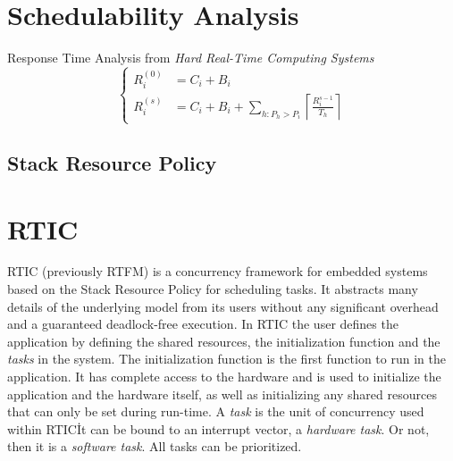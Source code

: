 \section{Schedulability Analysis}
Response Time Analysis from \textit{Hard Real-Time Computing Systems}\cite{hardrealtimecomputingsystems}
\begin{equation}
    \begin{cases}
        R_{i}^{(0)} &= C_i + B_i \\
        R_{i}^{(s)} &= C_i + B_i + \sum\limits_{h: P_h > P_i} \left\lceil \frac{R_{i}^{s-1}}{T_h} \right\rceil
    \end{cases}
\end{equation}
\subsection{Stack Resource Policy}


\section{RTIC}
RTIC (previously RTFM\cite{rtfm}) is a concurrency framework for embedded
systems based on the Stack Resource Policy\cite{srp} for scheduling tasks. It
abstracts many details of the underlying model from its users without any
significant overhead and a guaranteed deadlock-free execution. In RTIC the
user defines the application by defining the shared resources, the
initialization function and the \emph{tasks} in the system. The initialization
function is the first function to run in the application. It has complete
access to the hardware and is used to initialize the application and the
hardware itself, as well as initializing any shared resources that can only be
set during run-time. A \emph{task} is the unit of concurrency used within 
RTIC\. It can be bound to an interrupt vector, a \emph{hardware task}. Or not,
then it is a \emph{software task}. All tasks can be prioritized.


